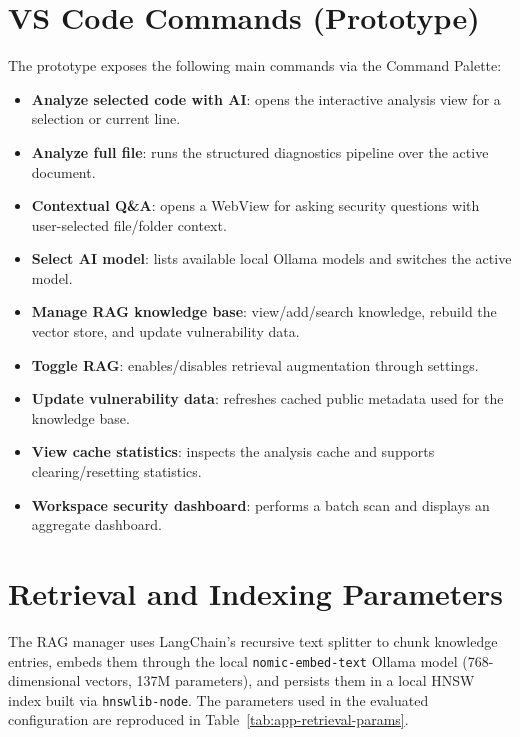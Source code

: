\section{VS Code Commands (Prototype)}
\label{app:commands}

The prototype exposes the following main commands via the Command Palette:
\begin{itemize}
  \item \textbf{Analyze selected code with AI}: opens the interactive analysis view for a selection or current line.
  \item \textbf{Analyze full file}: runs the structured diagnostics pipeline over the active document.
  \item \textbf{Contextual Q\&A}: opens a WebView for asking security questions with user-selected file/folder context.
  \item \textbf{Select AI model}: lists available local Ollama models and switches the active model.
  \item \textbf{Manage RAG knowledge base}: view/add/search knowledge, rebuild the vector store, and update vulnerability data.
  \item \textbf{Toggle RAG}: enables/disables retrieval augmentation through settings.
  \item \textbf{Update vulnerability data}: refreshes cached public metadata used for the knowledge base.
  \item \textbf{View cache statistics}: inspects the analysis cache and supports clearing/resetting statistics.
  \item \textbf{Workspace security dashboard}: performs a batch scan and displays an aggregate dashboard.
\end{itemize}

\section{Retrieval and Indexing Parameters}
\label{app:retrieval-params}

The RAG manager uses LangChain's recursive text splitter to chunk knowledge entries, embeds them through the local \texttt{nomic-embed-text} Ollama model (768-dimensional vectors, 137M parameters), and persists them in a local HNSW index built via \texttt{hnswlib-node}. The parameters used in the evaluated configuration are reproduced in Table~\ref{tab:app-retrieval-params}.

